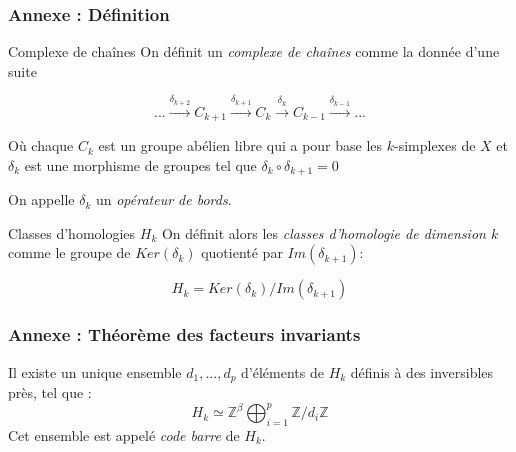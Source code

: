 \documentclass{beamer}
\begin{document}
\appendix

\begin{frame}
    \frametitle{Annexe : Définition}
    \begin{block}{Complexe de chaînes}
        On définit un \textit{complexe de chaînes} comme la donnée d'une suite 
    
        $$... \xrightarrow{\delta_{k+2}} C_{k+1} \xrightarrow{\delta_{k+1}} C_k \xrightarrow{\delta_k} C_{k-1} \xrightarrow{\delta_{k-1}} ...$$

        Où chaque $C_k$ est un groupe abélien libre qui a pour base les $k$-simplexes de $X$ et $\delta_k$ est une morphisme de groupes tel que $\delta_k \circ \delta_{k+1} = 0$
        
        On appelle $\delta_k$ un \textit{opérateur de bords}.

    \end{block}
    \begin{block}{Classes d'homologies $H_k$}
    On définit alors les \textit{classes d'homologie de dimension $k$} comme le groupe de $Ker(\delta_k)$ quotienté par $Im(\delta_{k+1})$:

    $$H_k = Ker(\delta_k) / Im(\delta_{k+1})$$
    \end{block}
\end{frame}

\begin{frame}
    \frametitle{Annexe : Théorème des facteurs invariants}
    Il existe un unique ensemble ${d_1, ..., d_p}$ d'éléments de $H_k$ définis à des inversibles près, tel que :
    $$H_k \simeq \mathbb{Z}^\beta \bigoplus_{i=1}^p \mathbb{Z} / d_i \mathbb{Z}$$
    Cet ensemble est appelé \textit{code barre} de $H_k$.
\end{frame}
\end{document}
